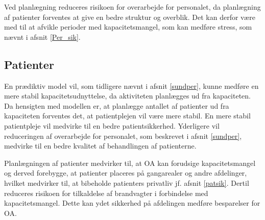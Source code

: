 Ved planlægning reduceres risikoen for overarbejde for personalet, da planlægning af patienter forventes at give en bedre struktur og overblik. Det kan derfor være med til at afvikle perioder med kapacitetsmangel, som kan medføre stress, som nævnt i afsnit \ref{Per_sik}.




\subsection{Patienter}
En prædiktiv model vil, som tidligere nævnt i afsnit \ref{sundper}, kunne medføre en mere stabil kapacitetsudnyttelse, da aktiviteten planlægges ud fra kapaciteten. Da hensigten med modellen er, at planlægge antallet af patienter ud fra kapaciteten forventes det, at patientplejen vil være mere stabil. En mere stabil patientpleje vil medvirke til en bedre patientsikkerhed. Yderligere vil reduceringen af overarbejde for personalet, som beskrevet i afsnit \ref{sundper}, medvirke til en bedre kvalitet af behandlingen af patienterne. 

Planlægningen af patienter medvirker til, at OA kan forudsige kapacitetsmangel og derved forebygge, at patienter placeres på gangarealer og andre afdelinger, hvilket medvirker til, at bibeholde patienters privatliv jf. afsnit \ref{patsik}. Dertil reduceres risikoen for tilkaldelse af brandvagter i forbindelse med kapacitetsmangel. Dette kan ydet sikkerhed på afdelingen medføre besparelser for OA. 

